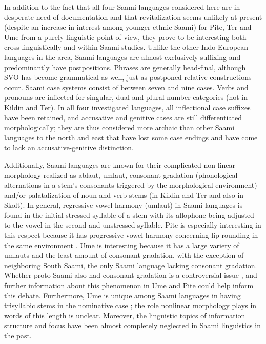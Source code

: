 \documentclass[a4paper,12pt]{article}
\begin{document}
In addition to the fact that all four Saami languages considered here are in desperate need of documentation and that revitalization seems unlikely at present (despite an increase in interest among younger ethnic Saami) for Pite, Ter and Ume from a purely linguistic point of view, they prove to be interesting both cross-linguistically and within Saami studies. Unlike the other Indo-European languages in the area, Saami languages are almost exclusively suffixing and predominantly have postpositions. Phrases are generally head-final, although SVO has become grammatical as well, just as postponed relative constructions occur. Saami case systems consist of between seven and nine cases. Verbs and pronouns are inflected for singular, dual and plural number categories (not in Kildin and Ter). In all four investigated languages, all inflectional case suffixes have been retained, and accusative and genitive cases are still differentiated morphologically; they are thus considered more archaic than other Saami languages to the north and east that have lost some case endings and have come to lack an accusative-genitive distinction.

Additionally, Saami languages are known for their complicated non-linear morphology realized as ablaut, umlaut, consonant gradation (phonological alternations in a stem's consonants triggered by the morphological environment) and/or palatalization of noun and verb stems (in Kildin and Ter and also in Skolt). In general, regressive vowel harmony (umlaut) in Saami languages is found in the initial stressed syllable of a stem with its allophone being adjusted to the vowel in the second and unstressed syllable. Pite is especially interesting in this respect because it has progressive vowel harmony concerning lip rounding in the same environment \cite[272]{korhonen2005a}. Ume is interesting because it has a large variety of umlauts and the least amount of consonant gradation, with the exception of neighboring South Saami, the only Saami language lacking consonant gradation. Whether proto-Saami also had consonant gradation is a controversial issue \cite[cf.][154–55]{svonni2006}, and further information about this phenomenon in Ume and Pite could help inform this debate. Furthermore, Ume is unique among Saami languages in having trisyllabic stems in the nominative case \cite[421]{korhonen2005b}; the role nonlinear morphology plays in words of this length is unclear. Moreover, the linguistic topics of information structure and focus have been almost completely neglected in Saami linguistics in the past.
\end{document}
